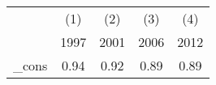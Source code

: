 \begin{tabular}{l*{4}{c}} \toprule
            &\multicolumn{1}{c}{(1)}&\multicolumn{1}{c}{(2)}&\multicolumn{1}{c}{(3)}&\multicolumn{1}{c}{(4)}\\
            &\multicolumn{1}{c}{1997}&\multicolumn{1}{c}{2001}&\multicolumn{1}{c}{2006}&\multicolumn{1}{c}{2012}\\
\midrule
\_cons      &        0.94&        0.92&        0.89&        0.89\\
\bottomrule
\end{tabular}
